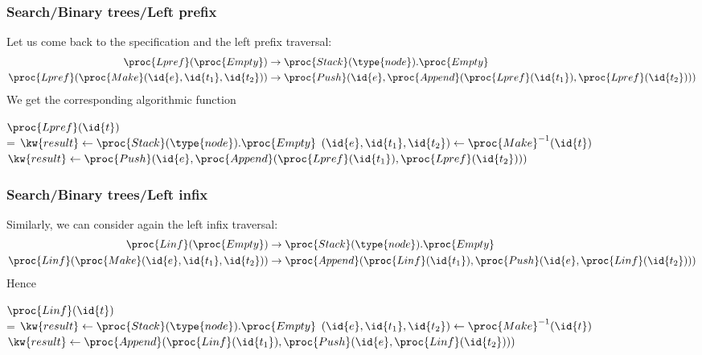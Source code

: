 %
\begin{frame}
\frametitle{Search/Binary trees/Left prefix}

Let us come back to the  specification and the left
prefix traversal:
{\small
\begin{align*}
   \proc{Lpref} (\proc{Empty}) 
&\rightarrow \proc{Stack}(\type{node}).\proc{Empty}\\
   \proc{Lpref} (\proc{Make} (\id{e}, \id{t_1}, \id{t_2})) 
&\rightarrow \proc{Push} (\id{e}, \proc{Append} (\proc{Lpref}
   (\id{t_1}), \proc{Lpref} (\id{t_2})))
\end{align*}
}
We get the corresponding algorithmic function
\begin{codebox}
\(\proc{Lpref} (\id{t})\)\\
\zi	\If {} = 
\zi	\Then \(\kw{result} \gets \proc{Stack}(\type{node}).\proc{Empty}\)
\zi	\Else \((\id{e}, \id{t_1}, \id{t_2}) \gets
                \proc{Make}^{-1}(\id{t})\)
\zi	      \(\kw{result} \gets \proc{Push} (\id{e},
                                                \proc{Append}
                                                  (\proc{Lpref} (\id{t_1}), 
                                                   \proc{Lpref}
                                                   (\id{t_2})))\)
\zi	\End
\end{codebox}

\end{frame}

%
\begin{frame}
\frametitle{Search/Binary trees/Left infix}

Similarly, we can consider again the left infix traversal:
\begin{align*}
   \proc{Linf} (\proc{Empty})
&\rightarrow \proc{Stack}(\type{node}).\proc{Empty}\\
   \proc{Linf} (\proc{Make} (\id{e}, \id{t_1}, \id{t_2})) 
&\rightarrow \proc{Append} (\proc{Linf} (\id{t_1}), 
   \proc{Push} (\id{e}, \proc{Linf} (\id{t_2})))
\end{align*}
Hence
\begin{codebox}
\(\proc{Linf} (\id{t})\)\\
\zi	\If {} = 
\zi	\Then \(\kw{result} \gets \proc{Stack}(\type{node}).\proc{Empty}\)
\zi	\Else \((\id{e}, \id{t_1}, \id{t_2}) \gets
                \proc{Make}^{-1}(\id{t})\)
\zi	        \(\kw{result} \gets \proc{Append} (\proc{Linf} (\id{t_1}),
                  \proc{Push} (\id{e}, \proc{Linf} (\id{t_2})))\)
\zi	\End
\end{codebox}

\end{frame}

